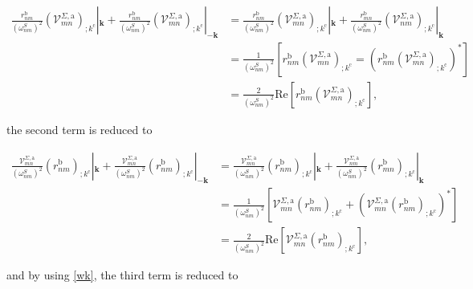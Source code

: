 \documentclass[11pt]{article}
\begin{document}
\begin{align}\label{first_term_gen_deriv}
\frac{r^{\text{b}}_{nm}}{(\omega^{S}_{nm})^{2}}\left(\mathcal{V}^{\Sigma,\text{a}}_{mn}\right)_{;k^{\text{c}}}|_{\mathbf{k}} + \frac{r^{\text{b}}_{nm}}{(\omega^{S}_{nm})^{2}}\left(\mathcal{V}^{\Sigma,\text{a}}_{mn}\right)_{;k^{\text{c}}}|_{-\mathbf{k}}
&= \frac{r^{\text{b}}_{nm}}{(\omega^{S}_{nm})^{2}}\left(\mathcal{V}^{\Sigma,\text{a}}_{mn}\right)_{;k^{\text{c}}}|_{\mathbf{k}} + \frac{r^{\text{b}}_{mn}}{(\omega^{S}_{nm})^{2}}\left(\mathcal{V}^{\Sigma,\text{a}}_{nm}\right)_{;k^{\text{c}}}|_{\mathbf{k}}\nonumber\\
&= \frac{1}{(\omega^{S}_{nm})^{2}}\left[r^{\text{b}}_{nm}\left(\mathcal{V}^{\Sigma,\text{a}}_{mn}\right)_{;k^{\text{c}}} = \left(r^{\text{b}}_{nm}\left(\mathcal{V}^{\Sigma,\text{a}}_{mn}\right)_{;k^{\text{c}}}\right)^*\right]\nonumber\\
&= \frac{2}{(\omega^{S}_{nm})^{2}}\mathrm{Re}\left[r^{\text{b}}_{nm}\left(\mathcal{V}^{\Sigma,\text{a}}_{mn}\right)_{;k^{\text{c}}}\right],
\end{align}

the second term is reduced to

\begin{align}\label{second_term_gen_deriv}
\frac{\mathcal{V}^{\Sigma,\text{a}}_{mn}}{(\omega^{S}_{nm})^{2}}\left(r^{\text{b}}_{nm}\right)_{;k^{\text{c}}}|_{\mathbf{k}} + \frac{\mathcal{V}^{\Sigma,\text{a}}_{mn}}{(\omega^{S}_{nm})^{2}}\left(r^{\text{b}}_{nm}\right)_{;k^{\text{c}}}|_{-\mathbf{k}}
&= \frac{\mathcal{V}^{\Sigma,\text{a}}_{mn}}{(\omega^{S}_{nm})^{2}}\left(r^{\text{b}}_{nm}\right)_{;k^{\text{c}}}|_{\mathbf{k}} + \frac{\mathcal{V}^{\Sigma,\text{a}}_{nm}}{(\omega^{S}_{nm})^{2}}\left(r^{\text{b}}_{mn}\right)_{;k^{\text{c}}}|_{\mathbf{k}}\nonumber\\
&= \frac{1}{(\omega^{S}_{nm})^{2}}\left[\mathcal{V}^{\Sigma,\text{a}}_{mn}\left(r^{\text{b}}_{nm}\right)_{;k^{\text{c}}} + \left(\mathcal{V}^{\Sigma,\text{a}}_{mn}\left(r^{\text{b}}_{nm}\right)_{;k^{\text{c}}}\right)^*\right]\nonumber\\
&= \frac{2}{(\omega^{S}_{nm})^{2}}\mathrm{Re}\left[\mathcal{V}^{\Sigma,\text{a}}_{mn}\left(r^{\text{b}}_{nm}\right)_{;k^{\text{c}}}\right],
\end{align}

and by using \eqref{wk}, the third term is reduced to
\end{document}
